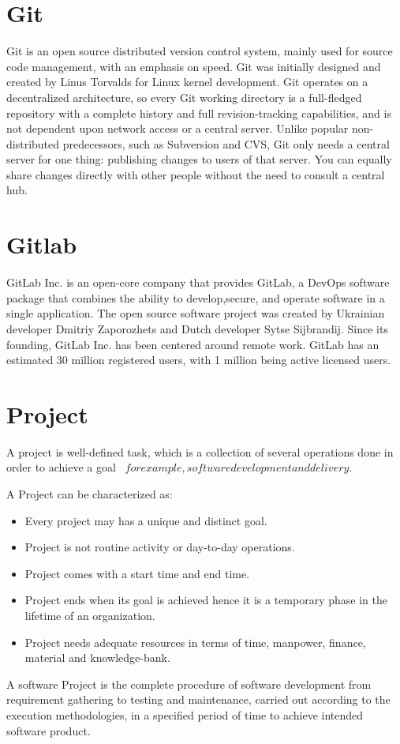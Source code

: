     \section{Git}
    Git is an open source distributed version control system, mainly used for source code management, with
    an emphasis on speed. Git was initially designed and created by Linus Torvalds for Linux kernel development.
    Git operates on a decentralized architecture, so every Git working directory is a full-fledged repository
    with a complete history and full revision-tracking capabilities, and is not dependent upon network access or 
    a central server. Unlike popular non-distributed predecessors, such as Subversion and CVS, Git only needs a 
    central server for one thing: publishing changes to users of that server. You can equally share changes 
    directly with other people without the need to consult a central hub.

    \section{Gitlab}
    GitLab Inc. is an open-core company that provides GitLab, a DevOps software package that combines the
    ability to develop,secure, and operate software in a single application. The open source software project
    was created by Ukrainian developer Dmitriy Zaporozhets and Dutch developer Sytse Sijbrandij. Since its
    founding, GitLab Inc. has been centered around remote work. GitLab has an estimated 30 million registered 
    users, with 1 million being active licensed users.

    \section{Project}
    A project is well-defined task, which is a collection of several operations done in order to achieve a goal 
     \(for example, software development and delivery\).
    \medspace
    
    A Project can be characterized as:
    \begin{itemize}
        \item Every project may has a unique and distinct goal.
        \item Project is not routine activity or day-to-day operations.
        \item Project comes with a start time and end time.
        \item Project ends when its goal is achieved hence it is a temporary phase in the lifetime of an organization.
        \item Project needs adequate resources in terms of time, manpower, finance, material and knowledge-bank.
    \end{itemize}

    A software Project is the complete procedure of software development from requirement gathering to testing and
    maintenance, carried out according to the execution methodologies, in a specified period of time to achieve 
    intended software product.
